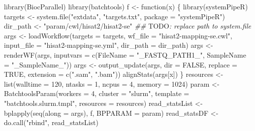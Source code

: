 \documentclass[14pt,]{article}
\newcommand{\hlnum}[1]{\textcolor[rgb]{0.816,0.125,0.439}{#1}}%
\newcommand{\hlstr}[1]{\textcolor[rgb]{0.251,0.627,0.251}{#1}}%
\newcommand{\hlcom}[1]{\textcolor[rgb]{0.502,0.502,0.502}{\textit{#1}}}%
\newcommand{\hlstd}[1]{\textcolor[rgb]{0.251,0.251,0.251}{#1}}%
\newcommand{\hlkwc}[1]{\textcolor[rgb]{0.251,0.251,0.251}{#1}}%
\newcommand{\hlkwd}[1]{\textcolor[rgb]{0.878,0.439,0.125}{#1}}%
\newenvironment{Shaded}{\begin{myshaded}}{\end{myshaded}}
\newcommand{\KeywordTok}[1]{\hlkwd{#1}}
\newcommand{\DataTypeTok}[1]{\hlkwc{#1}}
\newcommand{\DecValTok}[1]{\hlnum{#1}}
\newcommand{\StringTok}[1]{\hlstr{#1}}
\newcommand{\CommentTok}[1]{\hlcom{#1}}
\newcommand{\OtherTok}[1]{{#1}}
\newcommand{\ControlFlowTok}[1]{\hlkwd{#1}}
\newcommand{\AlertTok}[1]{\textcolor{errorcolor}{#1}}
\newcommand{\NormalTok}[1]{\hlstd{#1}}
\begin{document}
\begin{Shaded}
\begin{Highlighting}[]
\KeywordTok{library}\NormalTok{(BiocParallel)}
\KeywordTok{library}\NormalTok{(batchtools)}
\NormalTok{f <-}\StringTok{ }\ControlFlowTok{function}\NormalTok{(x) \{}
    \KeywordTok{library}\NormalTok{(systemPipeR)}
\NormalTok{    targets <-}\StringTok{ }\KeywordTok{system.file}\NormalTok{(}\StringTok{"extdata"}\NormalTok{, }\StringTok{"targets.txt"}\NormalTok{, }\DataTypeTok{package =} \StringTok{"systemPipeR"}\NormalTok{)}
\NormalTok{    dir_path <-}\StringTok{ "param/cwl/hisat2/hisat2-se"}  \CommentTok{## }\AlertTok{TODO}\CommentTok{: replace path to system.file }
\NormalTok{    args <-}\StringTok{ }\KeywordTok{loadWorkflow}\NormalTok{(}\DataTypeTok{targets =}\NormalTok{ targets, }\DataTypeTok{wf_file =} \StringTok{"hisat2-mapping-se.cwl"}\NormalTok{, }\DataTypeTok{input_file =} \StringTok{"hisat2-mapping-se.yml"}\NormalTok{, }
        \DataTypeTok{dir_path =}\NormalTok{ dir_path)}
\NormalTok{    args <-}\StringTok{ }\KeywordTok{renderWF}\NormalTok{(args, }\DataTypeTok{inputvars =} \KeywordTok{c}\NormalTok{(}\DataTypeTok{FileName =} \StringTok{"_FASTQ_PATH1_"}\NormalTok{, }\DataTypeTok{SampleName =} \StringTok{"_SampleName_"}\NormalTok{))}
\NormalTok{    args <-}\StringTok{ }\KeywordTok{output_update}\NormalTok{(args, }\DataTypeTok{dir =} \OtherTok{FALSE}\NormalTok{, }\DataTypeTok{replace =} \OtherTok{TRUE}\NormalTok{, }\DataTypeTok{extension =} \KeywordTok{c}\NormalTok{(}\StringTok{".sam"}\NormalTok{, }
        \StringTok{".bam"}\NormalTok{))}
    \KeywordTok{alignStats}\NormalTok{(args[x])}
\NormalTok{\}}
\NormalTok{resources <-}\StringTok{ }\KeywordTok{list}\NormalTok{(}\DataTypeTok{walltime =} \DecValTok{120}\NormalTok{, }\DataTypeTok{ntasks =} \DecValTok{1}\NormalTok{, }\DataTypeTok{ncpus =} \DecValTok{4}\NormalTok{, }\DataTypeTok{memory =} \DecValTok{1024}\NormalTok{)}
\NormalTok{param <-}\StringTok{ }\KeywordTok{BatchtoolsParam}\NormalTok{(}\DataTypeTok{workers =} \DecValTok{4}\NormalTok{, }\DataTypeTok{cluster =} \StringTok{"slurm"}\NormalTok{, }\DataTypeTok{template =} \StringTok{"batchtools.slurm.tmpl"}\NormalTok{, }
    \DataTypeTok{resources =}\NormalTok{ resources)}
\NormalTok{read_statsList <-}\StringTok{ }\KeywordTok{bplapply}\NormalTok{(}\KeywordTok{seq}\NormalTok{(}\DataTypeTok{along =}\NormalTok{ args), f, }\DataTypeTok{BPPARAM =}\NormalTok{ param)}
\NormalTok{read_statsDF <-}\StringTok{ }\KeywordTok{do.call}\NormalTok{(}\StringTok{"rbind"}\NormalTok{, read_statsList)}
\end{Highlighting}
\end{Shaded}
\end{document}
